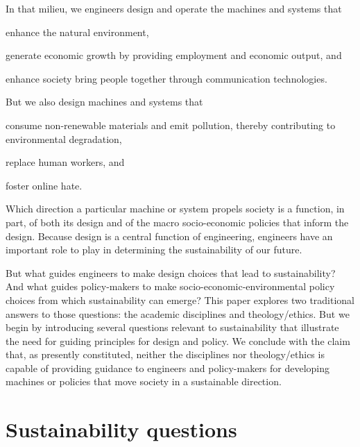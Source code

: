 \documentclass[12pt]{article}
\begin{document}
In that milieu, 
we engineers design and operate the machines and systems that
%
\begin{enumerate*}[label={(\alph*)}]

  \item enhance the natural environment,

  \item generate economic growth by providing employment and economic output, and

  \item enhance society bring people together through communication technologies.
        

\end{enumerate*}
%
But we also design machines and systems that
%
\begin{enumerate*}[label={(\alph*)}]

  \item consume non-renewable materials and
        emit pollution, thereby contributing to environmental degradation,

  \item replace human workers, and

  \item foster online hate.        

\end{enumerate*}
%
Which direction a particular machine or system propels society is a function, in part,
of both its design and of the macro socio-economic policies that inform the design.
Because design is a central function of engineering, 
engineers have an important role to play in determining 
the sustainability of our future. 

But what guides engineers to make design choices that lead to sustainability?
And what guides policy-makers to make socio-economic-environmental
policy choices from which sustainability can emerge?
This paper explores two traditional answers to those questions:
the academic disciplines and theology/ethics.
But we begin by introducing several questions relevant to sustainability
that illustrate the need for guiding principles for design and policy.
We conclude with the claim that, as presently constituted, 
neither the disciplines nor theology/ethics is capable of providing
guidance to engineers and policy-makers
for developing machines or policies that move society in a sustainable direction.


\section{Sustainability questions}
\label{sec:sustainability_questions}
\end{document}
